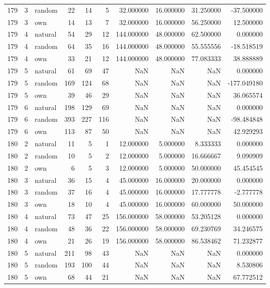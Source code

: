 \begin{table}[htbp]
\begin{tabular}{rrlrrrrrrr}
179 & 3 & random & 22 & 14 & 5 & 32.000000 & 16.000000 & 31.250000 & -37.500000 \\
179 & 3 & own & 14 & 13 & 7 & 32.000000 & 16.000000 & 56.250000 & 12.500000 \\
179 & 4 & natural & 54 & 29 & 12 & 144.000000 & 48.000000 & 62.500000 & 0.000000 \\
179 & 4 & random & 64 & 35 & 16 & 144.000000 & 48.000000 & 55.555556 & -18.518519 \\
179 & 4 & own & 33 & 21 & 12 & 144.000000 & 48.000000 & 77.083333 & 38.888889 \\
179 & 5 & natural & 61 & 69 & 47 & NaN & NaN & NaN & 0.000000 \\
179 & 5 & random & 169 & 124 & 68 & NaN & NaN & NaN & -177.049180 \\
179 & 5 & own & 39 & 46 & 29 & NaN & NaN & NaN & 36.065574 \\
179 & 6 & natural & 198 & 129 & 69 & NaN & NaN & NaN & 0.000000 \\
179 & 6 & random & 393 & 227 & 116 & NaN & NaN & NaN & -98.484848 \\
179 & 6 & own & 113 & 87 & 50 & NaN & NaN & NaN & 42.929293 \\
180 & 2 & natural & 11 & 5 & 1 & 12.000000 & 5.000000 & 8.333333 & 0.000000 \\
180 & 2 & random & 10 & 5 & 2 & 12.000000 & 5.000000 & 16.666667 & 9.090909 \\
180 & 2 & own & 6 & 5 & 3 & 12.000000 & 5.000000 & 50.000000 & 45.454545 \\
180 & 3 & natural & 36 & 15 & 4 & 45.000000 & 16.000000 & 20.000000 & 0.000000 \\
180 & 3 & random & 37 & 16 & 4 & 45.000000 & 16.000000 & 17.777778 & -2.777778 \\
180 & 3 & own & 18 & 10 & 4 & 45.000000 & 16.000000 & 60.000000 & 50.000000 \\
180 & 4 & natural & 73 & 47 & 25 & 156.000000 & 58.000000 & 53.205128 & 0.000000 \\
180 & 4 & random & 48 & 36 & 22 & 156.000000 & 58.000000 & 69.230769 & 34.246575 \\
180 & 4 & own & 21 & 26 & 19 & 156.000000 & 58.000000 & 86.538462 & 71.232877 \\
180 & 5 & natural & 211 & 98 & 43 & NaN & NaN & NaN & 0.000000 \\
180 & 5 & random & 193 & 100 & 44 & NaN & NaN & NaN & 8.530806 \\
180 & 5 & own & 68 & 44 & 21 & NaN & NaN & NaN & 67.772512 \\

\end{tabular}
\end{table}
